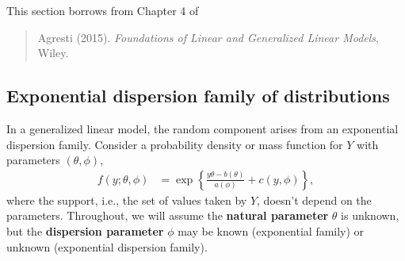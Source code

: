 \documentclass[
  11pt,
  letterpaper,
]{book}
\theoremstyle{definition}
\theoremstyle{definition}
\theoremstyle{definition}
\theoremstyle{definition}
\theoremstyle{remark}
\begin{document}
This section borrows from Chapter 4 of

\begin{quote}
Agresti (2015). \emph{Foundations of Linear and Generalized Linear Models}, Wiley.
\end{quote}

\hypertarget{exponential-dispersion-family-of-distributions}{%
\subsection{Exponential dispersion family of distributions}\label{exponential-dispersion-family-of-distributions}}

In a generalized linear model, the random component arises from an
exponential dispersion family. Consider a probability density or mass
function for \(Y\) with parameters \((\theta, \phi)\),
\begin{align}
f(y; \theta, \phi)&= \exp \left\{  \frac{y \theta -b(\theta)}{a(\phi)} + c(y, \phi)\right\}, 
\label{eq:expofam}
\end{align}
where the support, i.e., the set of values taken by \(Y\),
doesn't depend on the parameters. Throughout, we will assume the
\textbf{natural parameter} \(\theta\) is unknown, but the \textbf{dispersion
parameter} \(\phi\) may be known (exponential family) or unknown
(exponential dispersion family).
\end{document}

